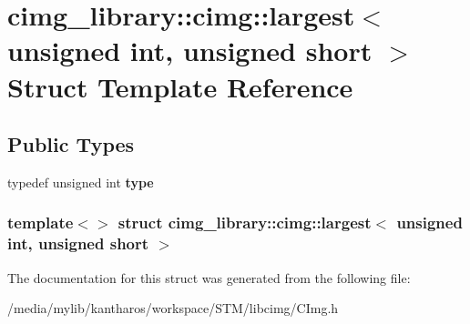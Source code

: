 \hypertarget{structcimg__library_1_1cimg_1_1largest_3_01unsigned_01int_00_01unsigned_01short_01_4}{
\section{cimg\_\-library::cimg::largest$<$ unsigned int, unsigned short $>$ Struct Template Reference}
\label{structcimg__library_1_1cimg_1_1largest_3_01unsigned_01int_00_01unsigned_01short_01_4}
}
\subsection*{Public Types}
\begin{DoxyCompactItemize}
\item 
\hypertarget{structcimg__library_1_1cimg_1_1largest_3_01unsigned_01int_00_01unsigned_01short_01_4_a8a9b1ec57bcad52cab8a165a765e9b8d}{
typedef unsigned int {\bfseries type}}
\label{structcimg__library_1_1cimg_1_1largest_3_01unsigned_01int_00_01unsigned_01short_01_4_a8a9b1ec57bcad52cab8a165a765e9b8d}

\end{DoxyCompactItemize}
\subsubsection*{template$<$$>$ struct cimg\_\-library::cimg::largest$<$ unsigned int, unsigned short $>$}



The documentation for this struct was generated from the following file:\begin{DoxyCompactItemize}
\item 
/media/mylib/kantharos/workspace/STM/libcimg/CImg.h\end{DoxyCompactItemize}
